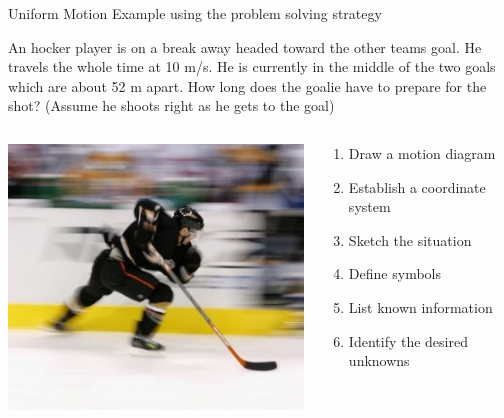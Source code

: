 \documentclass{beamer}
\newcommand{\red}[1]{{\color{red}{#1}}}
\begin{document}
\begin{frame}{Uniform Motion Example using the problem solving strategy}
\begin{center}
   An hocker player is on a break away headed toward the other teams goal. He travels the whole time at 10 m/s. He is currently in the middle of the two goals which are about 52 m apart. How long does the goalie have to prepare for the shot? (Assume he shoots right as he gets to the goal)
   \begin{columns}
   \begin{column}{0.4\textwidth}
      \begin{center}
         \includegraphics[width=\textwidth]{../figures/hockey1.jpg}
      \end{center}
   \end{column}
   \begin{column}{0.6\textwidth}
   \begin{enumerate}
      \item Draw a motion diagram
      \item Establish a coordinate system
      \item Sketch the situation
      \item Define symbols
      \item List known information
      \item Identify the desired unknowns
   \end{enumerate}
   \end{column}
   \end{columns}
   \uncover<2>{\red{$t=2.6$ s}}
\end{center}
\end{frame}
\end{document}
